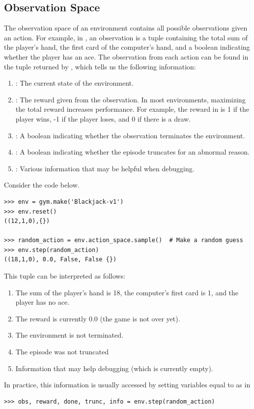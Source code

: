 \subsection*{Observation Space}
The observation space of an environment contains all possible observations given an action.
For example, in , an observation is a tuple containing the total sum of the player's hand, the first card of the computer's hand, and a boolean indicating whether the player has an ace.
The observation from each action can be found in the tuple returned by , which tells us the following information:
\begin{enumerate}
\item {}: The current state of the environment.
\item {}: The reward given from the observation. 
In most environments, maximizing the total reward increases performance. 
For example, the reward in  is 1 if the player wins, -1 if the player loses, and 0 if there is a draw.
\item {}: A boolean indicating whether the observation terminates the environment.
\item {}: A boolean indicating whether the episode truncates for an abnormal reason.
\item {}: Various information that may be helpful when debugging.
\end{enumerate}
Consider the code below.

\begin{lstlisting}
>>> env = gym.make('Blackjack-v1')
>>> env.reset()
((12,1,0),{})

>>> random_action = env.action_space.sample()  # Make a random guess
>>> env.step(random_action)
((18,1,0), 0.0, False, False {})
\end{lstlisting}
This tuple can be interpreted as follows:
\begin{enumerate}
\item The sum of the player's hand is 18, the computer's first card is 1, and the player has no ace.
\item The reward is currently 0.0 (the game is not over yet).
\item The environment is not terminated.
\item The episode was not truncated
\item Information that may help debugging (which is currently empty).
\end{enumerate}
In practice, this information is usually accessed by setting variables equal to  as in 
\begin{lstlisting}
>>> obs, reward, done, trunc, info = env.step(random_action)
\end{lstlisting}

